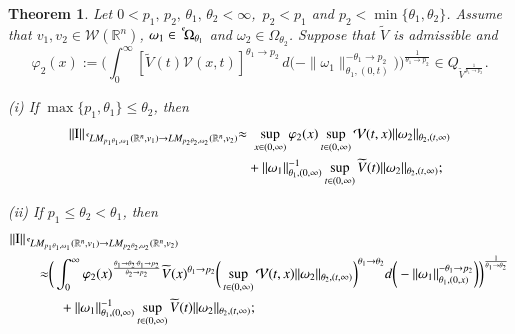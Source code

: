 \documentclass[11pt]{amsart}
\theoremstyle{plain}
\newtheorem{thm}{Theorem}[section]
\theoremstyle{definition}
\numberwithin{thm}{section}
\numberwithin{equation}{section}
\begin{document}
\begin{thm}\label{maintheorem3}
	Let $0 < p_1, \,p_2, \,{\theta}_1, \,{\theta}_2 < \infty$,\ $p_2 < p_1$ and $p_2 < \min\{{\theta}_1,{\theta}_2\}$. Assume that $v_1, v_2\in {{\mathcal W}}({{\mathbb R}^n})$, ${\omega}_1 \in	{\,^{^{\bf c}}\!}{{\Omega}_{{\theta}_1}}$ and ${\omega}_2\in {\Omega}_{{\theta}_2}$.
	Suppose that $\widetilde{V}$ is admissible and
	\begin{equation*}
	{\varphi}_2(x):= \bigg(\int_0^{\infty} [\widetilde{V}(t){\mathcal V}(x,t)]^{{\theta}_1{\rightarrow} p_2}\,d\bigg(-\|{\omega}_1\|_{{\theta}_1,(0,t)}^{-{\theta}_1{\rightarrow} p_2}\bigg)\bigg)^{\frac{1}{{\theta}_1 {\rightarrow} p_2}} \in Q_{{\widetilde{V}}^{\frac{1}{p_1{\rightarrow} p_2}}}.
	\end{equation*}
	
	
	
	
	
	
	
	
	
	
	
	{\rm (i)} If $\max\{p_1,{\theta}_1\}\leq {\theta}_2$, then
	\begin{align*}
	\|{\operatorname{I}}\|_{{\,^{^{\bf c}}\!} LM_{p_1{\theta}_1,{\omega}_1}({{\mathbb R}^n},v_1){\rightarrow} LM_{p_2{\theta}_2,{\omega}_2}({{\mathbb R}^n},v_2)} {\approx} & \,\, \sup_{x\in (0,\infty)} {\varphi}_2(x) \sup_{t\in (0,\infty)} {\mathcal V}(t,x) \|{\omega}_2\|_{{\theta}_2,(t,\infty)} \\
	& + \|{\omega}_1\|_{{\theta}_1,(0,\infty)}^{-1} \sup_{t\in (0,\infty)} \widetilde{V}(t) \|{\omega}_2\|_{{\theta}_2,(t,\infty)};
	\end{align*}
	
	{\rm (ii)} If $p_1 \leq {\theta}_2 < {\theta}_1$, then
	\begin{align*}
	\|{\operatorname{I}}\|_{{\,^{^{\bf c}}\!} LM_{p_1{\theta}_1,{\omega}_1}({{\mathbb R}^n},v_1){\rightarrow} LM_{p_2{\theta}_2,{\omega}_2}({{\mathbb R}^n},v_2)} & \\
	& \hspace{-3.5cm} {\approx} \bigg( \int_0^{\infty} {\varphi}_2(x)^{\frac{{\theta}_1 {\rightarrow} {\theta}_2 \cdot {\theta}_1 {\rightarrow} p_2}{{\theta}_2 {\rightarrow} p_2}} \widetilde{V}(x)^{{\theta}_1 {\rightarrow} p_2} \bigg(\sup_{t\in(0,\infty)} {\mathcal V}(t,x) \|{\omega}_2\|_{{\theta}_2,(t,\infty)}\bigg)^{{\theta}_1 {\rightarrow} {\theta}_2} d \bigg( - \|{\omega}_1\|_{{\theta}_1,(0,x)}^{-{\theta}_1 {\rightarrow} p_2}\bigg) \bigg)^{\frac{1}{{\theta}_1 {\rightarrow} {\theta}_2}} \\
	& \hspace{-3cm} + \|{\omega}_1\|_{{\theta}_1,(0,\infty)}^{-1} \sup_{t\in (0,\infty)} \widetilde{V}(t) \|{\omega}_2\|_{{\theta}_2,(t,\infty)};
	\end{align*}
	

\end{thm}
\end{document}

